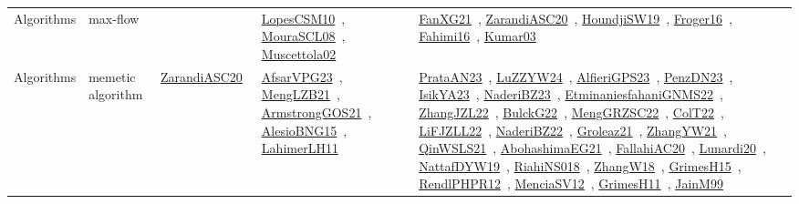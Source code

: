 {\begin{longtable}{lp{3cm}>{\raggedright\arraybackslash}p{6cm}>{\raggedright\arraybackslash}p{6cm}>{\raggedright\arraybackslash}p{8cm}}
\index{max-flow}\index{Algorithms!max-flow}Algorithms & max-flow &  & \href{../works/LopesCSM10.pdf}{LopesCSM10}~\cite{LopesCSM10}, \href{../works/MouraSCL08.pdf}{MouraSCL08}~\cite{MouraSCL08}, \href{../works/Muscettola02.pdf}{Muscettola02}~\cite{Muscettola02} & \href{../works/FanXG21.pdf}{FanXG21}~\cite{FanXG21}, \href{../works/ZarandiASC20.pdf}{ZarandiASC20}~\cite{ZarandiASC20}, \href{../works/HoundjiSW19.pdf}{HoundjiSW19}~\cite{HoundjiSW19}, \href{../works/Froger16.pdf}{Froger16}~\cite{Froger16}, \href{../works/Fahimi16.pdf}{Fahimi16}~\cite{Fahimi16}, \href{../works/Kumar03.pdf}{Kumar03}~\cite{Kumar03}\\
\index{memetic algorithm}\index{Algorithms!memetic algorithm}Algorithms & memetic algorithm & \href{../works/ZarandiASC20.pdf}{ZarandiASC20}~\cite{ZarandiASC20} & \href{../works/AfsarVPG23.pdf}{AfsarVPG23}~\cite{AfsarVPG23}, \href{../works/MengLZB21.pdf}{MengLZB21}~\cite{MengLZB21}, \href{../works/ArmstrongGOS21.pdf}{ArmstrongGOS21}~\cite{ArmstrongGOS21}, \href{../works/AlesioBNG15.pdf}{AlesioBNG15}~\cite{AlesioBNG15}, \href{../works/LahimerLH11.pdf}{LahimerLH11}~\cite{LahimerLH11} & \href{../works/PrataAN23.pdf}{PrataAN23}~\cite{PrataAN23}, \href{../works/LuZZYW24.pdf}{LuZZYW24}~\cite{LuZZYW24}, \href{../works/AlfieriGPS23.pdf}{AlfieriGPS23}~\cite{AlfieriGPS23}, \href{../works/PenzDN23.pdf}{PenzDN23}~\cite{PenzDN23}, \href{../works/IsikYA23.pdf}{IsikYA23}~\cite{IsikYA23}, \href{../works/NaderiBZ23.pdf}{NaderiBZ23}~\cite{NaderiBZ23}, \href{../works/EtminaniesfahaniGNMS22.pdf}{EtminaniesfahaniGNMS22}~\cite{EtminaniesfahaniGNMS22}, \href{../works/ZhangJZL22.pdf}{ZhangJZL22}~\cite{ZhangJZL22}, \href{../works/BulckG22.pdf}{BulckG22}~\cite{BulckG22}, \href{../works/MengGRZSC22.pdf}{MengGRZSC22}~\cite{MengGRZSC22}, \href{../works/ColT22.pdf}{ColT22}~\cite{ColT22}, \href{../works/LiFJZLL22.pdf}{LiFJZLL22}~\cite{LiFJZLL22}, \href{../works/NaderiBZ22.pdf}{NaderiBZ22}~\cite{NaderiBZ22}, \href{../works/Groleaz21.pdf}{Groleaz21}~\cite{Groleaz21}, \href{../works/ZhangYW21.pdf}{ZhangYW21}~\cite{ZhangYW21}, \href{../works/QinWSLS21.pdf}{QinWSLS21}~\cite{QinWSLS21}, \href{../works/AbohashimaEG21.pdf}{AbohashimaEG21}~\cite{AbohashimaEG21}, \href{../works/FallahiAC20.pdf}{FallahiAC20}~\cite{FallahiAC20}, \href{../works/Lunardi20.pdf}{Lunardi20}~\cite{Lunardi20}, \href{../works/NattafDYW19.pdf}{NattafDYW19}~\cite{NattafDYW19}, \href{../works/RiahiNS018.pdf}{RiahiNS018}~\cite{RiahiNS018}, \href{../works/ZhangW18.pdf}{ZhangW18}~\cite{ZhangW18}, \href{../works/GrimesH15.pdf}{GrimesH15}~\cite{GrimesH15}, \href{../works/RendlPHPR12.pdf}{RendlPHPR12}~\cite{RendlPHPR12}, \href{../works/MenciaSV12.pdf}{MenciaSV12}~\cite{MenciaSV12}, \href{../works/GrimesH11.pdf}{GrimesH11}~\cite{GrimesH11}, \href{../works/JainM99.pdf}{JainM99}~\cite{JainM99}\\

\end{longtable}}
